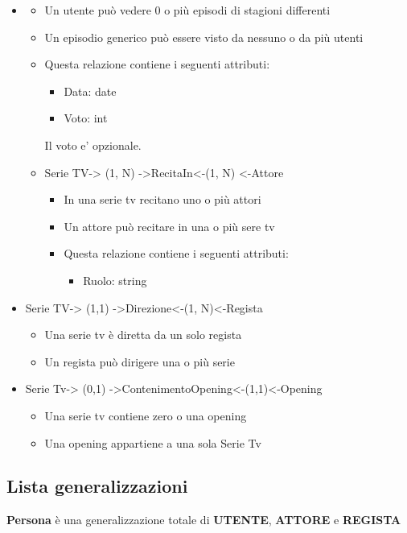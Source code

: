 \documentclass[12pt,a4paper]{article}
\begin{document}
\begin{itemize}
    \item \begin{itemize}
        \item Un utente può vedere 0 o più episodi di stagioni differenti
        \item Un episodio generico può essere visto da nessuno o da più utenti
        \item Questa relazione contiene i seguenti attributi:
        \begin{itemize}
            \item Data: date
            \item Voto: int
        \end{itemize}
        Il voto e' opzionale.
    \end{itemize}
    \begin{itemize}
        \item Serie TV-> (1, N) ->RecitaIn<-(1, N) <-Attore
        \begin{itemize}
            \item In una serie tv recitano uno o più attori
            \item Un attore può recitare in una o più sere tv
            \item Questa relazione contiene i seguenti attributi:
            \begin{itemize}
                \item Ruolo: string
            \end{itemize}
        \end{itemize}
    \end{itemize}
    \item Serie TV-> (1,1) ->Direzione<-(1, N)<-Regista 
    \begin{itemize}
        \item Una serie tv è diretta da un solo regista 
        \item Un regista può dirigere una o più serie 
    \end{itemize}
    \item Serie Tv-> (0,1) ->ContenimentoOpening<-(1,1)<-Opening
    \begin{itemize}
        \item Una serie tv contiene zero o una opening
        \item Una opening appartiene a una sola Serie Tv 
    \end{itemize} 
\end{itemize}
\subsection{Lista generalizzazioni}
\textbf{Persona} è una generalizzazione totale di \textbf{UTENTE}, \textbf{ATTORE} e \textbf{REGISTA} 
\end{document}
